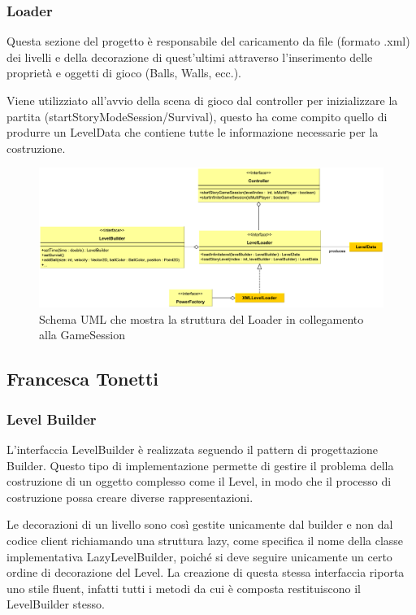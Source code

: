 \documentclass[a4paper,12pt]{report}
\begin{document}
\subsubsection*{Loader}
Questa sezione del progetto è responsabile del caricamento da file (formato .xml) dei livelli e della decorazione di quest'ultimi attraverso l'inserimento delle proprietà e oggetti di gioco (Balls, Walls, ecc.).

Viene utilizziato all'avvio della scena di gioco dal controller per inizializzare la partita (startStoryModeSession/Survival), questo ha come compito quello di produrre un LevelData che contiene tutte le informazione necessarie per la costruzione.
\begin{figure}[H]
\includegraphics[width=\linewidth]{img/loader}
\caption{Schema UML che mostra la struttura del Loader in collegamento alla GameSession}
\label{img:decorator}
\end{figure}


\subsection*{Francesca Tonetti}
\subsubsection*{Level Builder}
L'interfaccia LevelBuilder è realizzata seguendo il pattern di progettazione Builder.
Questo tipo di implementazione permette di gestire il problema della costruzione di un oggetto complesso come il Level, in modo che il processo di costruzione possa creare diverse rappresentazioni.

Le decorazioni di un livello sono così gestite unicamente dal builder e non dal codice client richiamando una struttura lazy, come specifica il nome della classe implementativa LazyLevelBuilder, poiché si deve seguire unicamente un certo ordine di decorazione del Level. 
La creazione di questa stessa interfaccia riporta uno stile fluent, infatti tutti i metodi da cui è composta restituiscono il LevelBuilder stesso.
\end{document}
